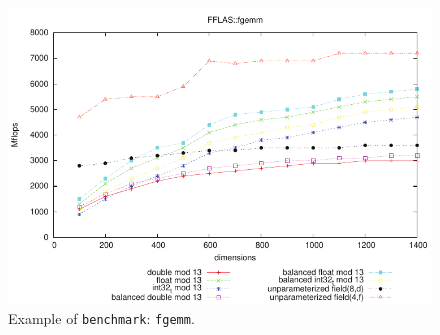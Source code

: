 \begin{figure}[htbp]
	\centering
	\small
	\includegraphics[scale=0.6]{fgemm_square_13_ok}
	\caption{Example of \texttt{benchmark}: \texttt{fgemm}.\label{fig:bench}}
\end{figure}


